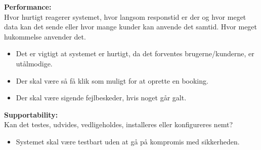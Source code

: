 \textbf{Performance:} \\
Hvor hurtigt reagerer systemet, hvor langsom responstid er der og hvor meget data kan det sende eller hvor mange kunder kan anvende det samtid. Hvor meget hukommelse anvender det.
\begin{itemize}
    \item Det er vigtigt at systemet er hurtigt, da det forventes brugerne/kunderne, er utålmodige.
    \item Der skal være så få klik som muligt for at oprette en booking.
    \item Der skal være sigende fejlbeskeder, hvis noget går galt. \\
\end{itemize}

\textbf{Supportability:} \\
Kan det testes, udvides, vedligeholdes, installeres eller konfigureres nemt?
\begin{itemize}
    \item Systemet skal være testbart uden at gå på kompromis med sikkerheden.
\end{itemize}